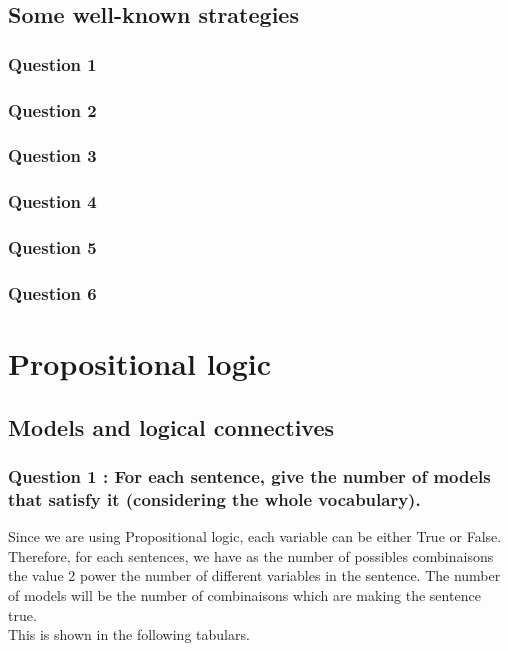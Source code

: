 \documentclass[a4paper,10pt]{article}
\begin{document}
\subsection{Some well-known strategies}
\subsubsection{Question 1}
\subsubsection{Question 2}
\subsubsection{Question 3}
\subsubsection{Question 4}
\subsubsection{Question 5}
\subsubsection{Question 6}



	
\newpage
	
	
	

\section{Propositional logic}
\subsection{Models and logical connectives}

\subsubsection*{Question 1 : For each sentence, give the number of models that satisfy it (considering the
whole vocabulary).\\}

Since we are using Propositional logic, each variable can be either True or False. Therefore, for each sentences, we have as the number of possibles combinaisons the value 2 power the number of different variables in the sentence. The number of models will be the number of combinaisons which are making the sentence true. \\
This is shown in the following tabulars. \\
\end{document}
